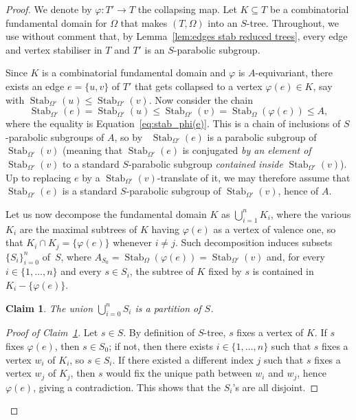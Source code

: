 \documentclass[svgnames]{amsart}
\theoremstyle{plain}
\newtheorem{claim}[thm]{Claim}
\theoremstyle{definition}
\newenvironment{claimproof}{\renewcommand{\qedsymbol}{$\blacksquare$}\begin{proof}}{\end{proof}}
\newcommand{\Stab}[2]{\operatorname{Stab}_{#1}\left(#2\right)}
\renewcommand{\phi}{\varphi}
\begin{document}
\begin{proof}
     We denote by $\phi\colon T'\to T$ the collapsing map. Let $K\subseteq T$ be a combinatorial fundamental domain for $\Omega$ that makes $(T,\Omega)$ into an $S$-tree. Throughout, we use without comment that, by Lemma~\ref{lem:edges stab reduced trees}, every edge and vertex stabiliser in $T$ and $T'$ is an $S$-parabolic subgroup.
     
     Since $K$ is a combinatorial fundamental domain and $\phi$ is $A$-equivariant, there exists an edge $e=\{u,v\}$ of $T'$ that gets collapsed to a vertex $\phi(e)\in K$, say with $\Stab{\Omega'}{u}\le\Stab{\Omega'}{v}$. Now consider the chain
    \begin{equation}
    \label{eqn:chain of stabs}
    \Stab{\Omega'}{e}=\Stab{\Omega'}{u}\le\Stab{\Omega'}{v}=\Stab{\Omega}{\phi(e)}\le A,
    \end{equation}
    where the equality is Equation~\eqref{eq:stab_phi(e)}. This is a chain of inclusions of $S$-parabolic subgroups of $A$, so by~\cite[Theorem 1.1]{blufstein2023parabolic} $\Stab{\Omega'}{e}$ is a parabolic subgroup of $\Stab{\Omega'}{v}$  (meaning that $\Stab{\Omega'}{e}$ is conjugated \emph{by an element of $\Stab{\Omega'}{v}$} to a standard $S$-parabolic subgroup \emph{contained inside} $\Stab{\Omega'}{v}$).  Up to replacing $e$ by a $\Stab{\Omega'}{v}$-translate of it, we may therefore assume that $\Stab{\Omega'}{e}$ is a standard $S$-parabolic subgroup of $\Stab{\Omega'}{v}$, hence of $A$.

    Let us now decompose the fundamental domain $K$ as $\bigcup_{i=1}^nK_i$, where the various $K_i$ are the maximal subtrees of $K$ having $\phi(e)$ as a vertex of valence one, so that $K_i\cap K_j=\{\phi(e)\}$ whenever $i\neq j$. Such decomposition induces subsets $\{S_i\}_{i=0}^n$ of~$S$, where $A_{S_0}=\Stab{\Omega}{\phi(e)} = \Stab{\Omega'}{v}$ and, for every $i\in\{1,\dots,n\}$ and every $s\in S_i$, the subtree of $K$ fixed by $s$ is contained in $K_i-\{\phi(e)\}$. 
    
    \begin{claim}\label{claim:partition}
        The union $\bigcup_{i=0}^n S_i$ is a partition of $S$.
    \end{claim} 

    \begin{claimproof}[Proof of Claim~\ref{claim:partition}]
    Let $s\in S$. By definition of $S$-tree, $s$ fixes a vertex of $K$. If $s$ fixes $\phi(e)$, then $s\in S_0$; if not, then there exists $i\in\{1,\dots,n\}$ such that $s$ fixes a vertex $w_i$ of $K_i$, so $s \in S_i$. If there existed a different index $j$ such that $s$ fixes a vertex $w_j$ of $K_j$, then $s$ would fix the unique path between $w_i$ and $w_j$, hence $\phi(e)$, giving a contradiction. This shows that the $S_i$'s are all disjoint.\end{claimproof}


\end{proof}
\end{document}
